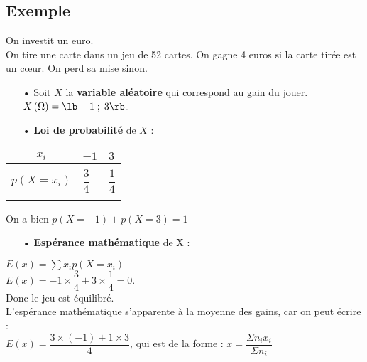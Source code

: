 \subsection{Exemple}

On investit un euro. \\ On tire une carte dans un jeu de 52 cartes. On gagne 4 euros si la carte tirée est un cœur. On perd sa mise sinon. \\

\begin{itemize}
\item[•] Soit $X$ la \textbf{variable aléatoire} qui correspond au gain du jouer. \\ 

$X\left(\Omega\right) = \lb -1 \; ; \; 3 \rb$. \\
\item[•] \textbf{Loi de probabilité} de $X$ : \\
\end{itemize}

\begin{tabular}{|c|l|l|}
\hline
$x_i$ & $-1$ & $3$ \\
\hline
& & \\
$p\left(X = x_i\right)$ & $\dfrac{3}{4}$ & $\dfrac{1}{4}$ \\
& & \\
\hline
\end{tabular}

\vspace*{.3cm}

On a bien $p\left(X = -1\right) + p\left(X = 3\right) = 1$ \\

\begin{itemize}
\item[•] \textbf{Espérance mathématique} de X : \\
\end{itemize}

$E(x) = \displaystyle \sum  x_ip\left(X = x_i\right)$ \\

$ E(x) = -1 \times \dfrac{3}{4} + 3 \times \dfrac{1}{4} = 0$. \\

Donc le jeu est équilibré. \\

L'espérance mathématique s'apparente à la moyenne des gains, car on peut écrire : \\

$E(x) = \dfrac{3 \times \left(-1\right)+ 1 \times 3}{4}$, qui est de la forme : $\overline{x} = \dfrac{\Sigma n_ix_i}{\Sigma n_i}$ \\

